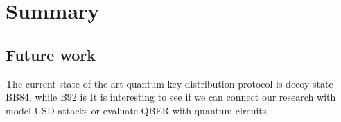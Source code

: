 
\chapter{Summary}
\label{chap:summary}

\section{Future work}
The current state-of-the-art quantum key distribution protocol is decoy-state
BB84, while B92 is 
It is interesting to see if we can connect our research with 
model USD attacks or evaluate QBER with
quantum circuits

